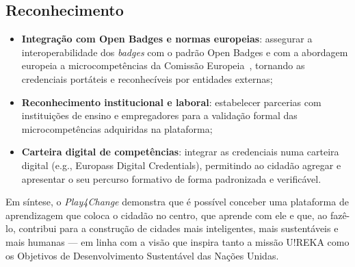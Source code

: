 \subsection*{Reconhecimento}

\begin{itemize}
  \item \textbf{Integração com Open Badges e normas europeias}: assegurar a interoperabilidade dos \textit{badges} com o padrão Open Badges e com a abordagem europeia a microcompetências da Comissão Europeia~\cite{eur2022micro}, tornando as credenciais portáteis e reconhecíveis por entidades externas;
  \item \textbf{Reconhecimento institucional e laboral}: estabelecer parcerias com instituições de ensino e empregadores para a validação formal das microcompetências adquiridas na plataforma;
  \item \textbf{Carteira digital de competências}: integrar as credenciais numa carteira digital (e.g., Europass Digital Credentials), permitindo ao cidadão agregar e apresentar o seu percurso formativo de forma padronizada e verificável.
\end{itemize}


Em síntese, o \textit{Play4Change} demonstra que é possível conceber uma plataforma de aprendizagem que coloca o cidadão no centro, que aprende com ele e que, ao fazê-lo, contribui para a construção de cidades mais inteligentes, mais sustentáveis e mais humanas --- em linha com a visão que inspira tanto a missão U!REKA como os Objetivos de Desenvolvimento Sustentável das Nações Unidas.
